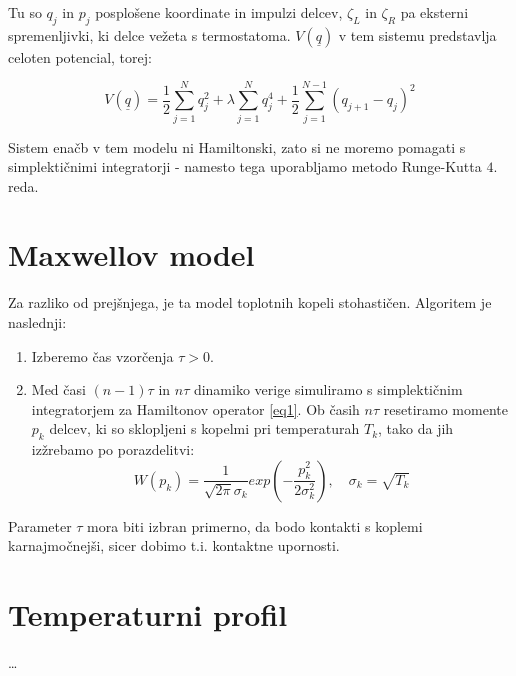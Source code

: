 \documentclass[a4paper]{article}
\newcommand{\half}{\frac{1}{2}}
\newcommand{\q}{\underline{q}}
\begin{document}
    Tu so $q_j$ in $p_j$ posplošene koordinate in impulzi delcev, $\zeta_L$ in $\zeta_R$ pa eksterni spremenljivki, ki
    delce vežeta s termostatoma. $V(\q)$ v tem sistemu predstavlja celoten potencial, torej:

    \begin{equation}\label{eq4}
        V(\q) = \half \sum_{j=1}^N q_j^2 + \lambda \sum_{j=1}^N q_j^4 + \half \sum_{j=1}^{N-1} (q_{j+1} - q_j)^2
    \end{equation}

    Sistem enačb v tem modelu ni Hamiltonski, zato si ne moremo pomagati s simplektičnimi integratorji - namesto tega
    uporabljamo metodo Runge-Kutta $4.$ reda.

    \section{Maxwellov model}

    Za razliko od prejšnjega, je ta model toplotnih kopeli stohastičen.
    Algoritem je naslednji:

    \begin{enumerate}
        \item Izberemo čas vzorčenja $\tau > 0$.
        \item Med časi $(n - 1)\tau$ in $n\tau$ dinamiko verige simuliramo s simplektičnim integratorjem za Hamiltonov
        operator \ref{eq1}.
        Ob časih $n\tau$ resetiramo momente $p_k$ delcev, ki so sklopljeni s kopelmi pri temperaturah $T_k$, tako da
        jih izžrebamo po porazdelitvi:
        \begin{equation}\label{eq5}
            W(p_k) = \frac{1}{\sqrt{2\pi}\sigma_k} exp\left( -\frac{p_k^2}{2\sigma_k^2} \right),
            \quad \sigma_k = \sqrt{T_k}
        \end{equation}
    \end{enumerate}

    Parameter $\tau$ mora  biti  izbran  primerno,  da  bodo  kontakti  s  koplemi  karnajmočnejši, sicer dobimo t.i.
    kontaktne upornosti.

    \section{Temperaturni profil}

    \ldots

    \iffalse
    \begin{figure}
        \centering
        \texttt{[image: slika1.pdf]}
        \caption{\ldots}
        \label{slika1}
    \end{figure}
    \fi
\end{document}
